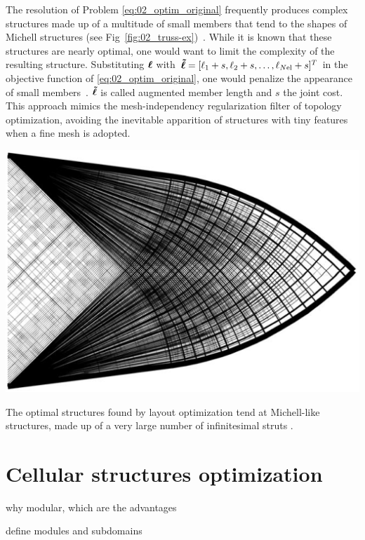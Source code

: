 The resolution of Problem \ref{eq:02_optim_original} frequently produces complex structures made up of a multitude of small members that tend to the shapes of Michell structures (see Fig~\ref{fig:02_truss-ex})~. While it is known that these structures are nearly optimal, one would want to limit the complexity of the resulting structure. Substituting $\bm{\ell}$ with $\bm{\tilde{\ell}} = [\ell_1 + s, \ell_2 + s, \ldots,\ell_{N\text{el}} + s]^T$ in the objective function of \ref{eq:02_optim_original}, one would penalize the appearance of small members~. $\bm{\tilde{\ell}}$ is called augmented member length and $s$ the joint cost. This approach mimics the mesh-independency regularization filter of topology optimization, avoiding the inevitable apparition of structures with tiny features when a fine mesh is adopted.

\begin{marginfigure}
    \centering
    \includegraphics[width=\linewidth]{figures/02_literature/truss-ex.png}
    \caption{The optimal structures found by layout optimization tend at Michell-like structures, made up of a very large number of infinitesimal struts \cite{gilbert_layout_2003}.}
    \label{fig:02_truss-ex}
\end{marginfigure}

\section{Cellular structures optimization}
why modular, which are the advantages

define modules and subdomains

